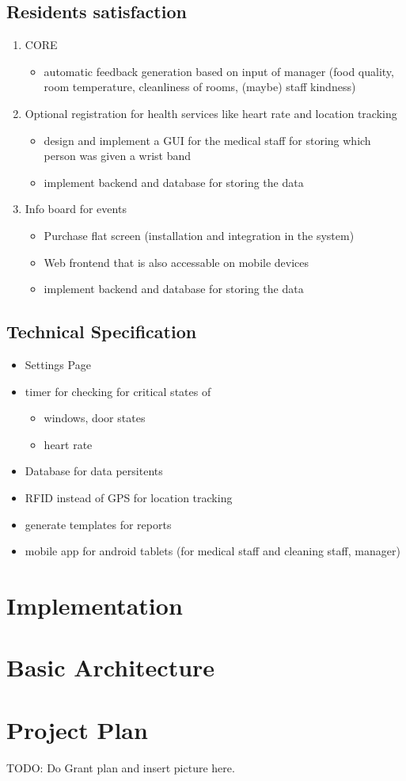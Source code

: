 \subsection{Residents satisfaction}
\label{sec:org903f351}
\begin{enumerate}
\item CORE
\label{sec:orgaf1de29}
\begin{itemize}
\item automatic feedback generation based on input of manager (food quality, room
temperature, cleanliness of rooms, (maybe) staff kindness)
\end{itemize}
\item Optional registration for health services like heart rate and location tracking
\label{sec:org0528d08}
\begin{itemize}
\item design and implement a GUI for the medical staff for storing which person was given a wrist band
\item implement backend and database for storing the data
\end{itemize}
\item Info board for events
\label{sec:orgcba1be4}
\begin{itemize}
\item Purchase flat screen (installation and integration in the system)
\item Web frontend that is also accessable on mobile devices
\item implement backend and database for storing the data
\end{itemize}
\end{enumerate}


\subsection{Technical Specification}
\label{sec:org896d172}
\begin{itemize}
\item Settings Page
\item timer for checking for critical states of
\begin{itemize}
\item windows, door states
\item heart rate
\end{itemize}
\item Database for data persitents
\item RFID instead of GPS for location tracking
\item generate templates for reports
\item mobile app for android tablets (for medical staff and cleaning staff, manager)
\end{itemize}




\section{Implementation}
\label{sec:orgaa7b811}

\section{Basic Architecture}
\label{sec:org0a88fdc}
\section{Project Plan}
\label{sec:org8452a3e}
TODO: Do Grant plan and insert picture here.

